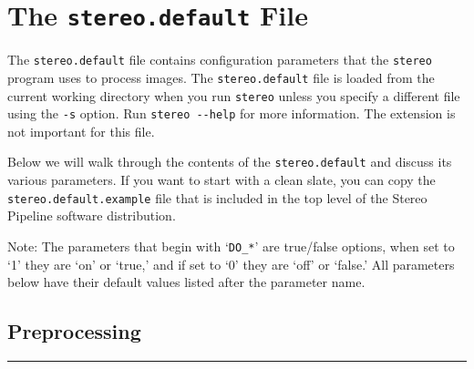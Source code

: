 \chapter{The {\tt stereo.default} File}
\label{ch:stereodefault}

The \texttt{stereo.default} file contains configuration parameters
that the \texttt{stereo} program uses to process images.  The
\texttt{stereo.default} file is loaded from the current working
directory when you run \texttt{stereo} unless you specify a different
file using the \texttt{-s} option. Run \texttt{stereo -\/-help} for
more information. The extension is not important for this file.

Below we will walk through the contents of the \texttt{stereo.default}
and discuss its various parameters.  If you want to start with a clean
slate, you can copy the \texttt{stereo.default.example} file that is
included in the top level of the Stereo Pipeline software distribution.

Note: The parameters that begin with `\texttt{DO\_*}' are true/false
options, when set to `1' they are `on' or `true,' and if set to `0'
they are `off' or `false.'  All parameters below have their default
values listed after the parameter name.


\section{Preprocessing}
\hrule
\bigskip

